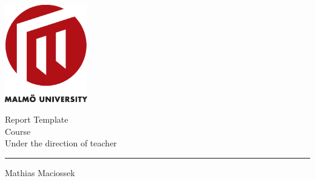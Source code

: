\begin{titlepage}
\begin{flushright}
\includegraphics[width=36mm]{images/logo}
\end{flushright}

\begin{flushleft}

\vspace{15mm}
\Huge Report Template \\
\renewcommand{\baselinestretch}{0.98}
\Large Course \\ Under the direction of teacher

\vspace{10mm}
\rule{0.95\textwidth}{0.4pt}
\vspace{10mm}



\Large %
\vspace{05mm}
Mathias Maciossek

\renewcommand{\baselinestretch}{1.0}\normalsize
\end{flushleft}
\end{titlepage}